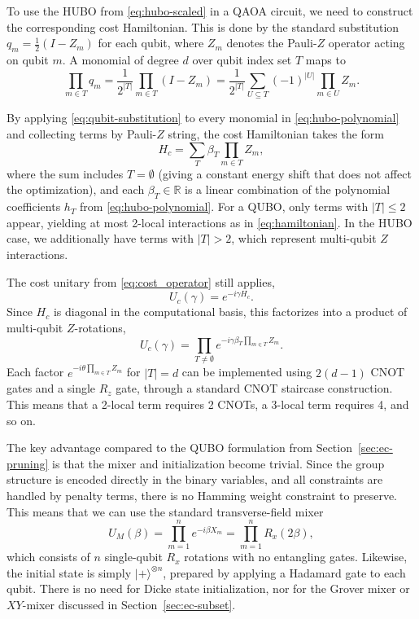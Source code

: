 \documentclass{article}
\begin{document}
To use the HUBO from \eqref{eq:hubo-scaled} in a QAOA circuit, we need to construct the corresponding cost Hamiltonian. This is done by the standard substitution $q_m = \frac{1}{2}(I - Z_m)$ for each qubit, where $Z_m$ denotes the Pauli-$Z$ operator acting on qubit $m$. A monomial of degree $d$ over qubit index set $T$ maps to
\begin{equation}
    \prod_{m \in T} q_m = \frac{1}{2^{|T|}} \prod_{m \in T} (I - Z_m) = \frac{1}{2^{|T|}} \sum_{U \subseteq T} (-1)^{|U|} \prod_{m \in U} Z_m.
    \label{eq:qubit-substitution}
\end{equation}

By applying \eqref{eq:qubit-substitution} to every monomial in \eqref{eq:hubo-polynomial} and collecting terms by Pauli-$Z$ string, the cost Hamiltonian takes the form
\begin{equation}
    H_c = \sum_{T} \beta_T \prod_{m \in T} Z_m,
    \label{eq:hubo-hamiltonian}
\end{equation}
where the sum includes $T = \emptyset$ (giving a constant energy shift that does not affect the optimization), and each $\beta_T \in \mathbb{R}$ is a linear combination of the polynomial coefficients $h_T$ from \eqref{eq:hubo-polynomial}.
For a QUBO, only terms with $|T| \leq 2$ appear, yielding at most 2-local interactions as in \eqref{eq:hamiltonian}. In the HUBO case, we additionally have terms with $|T| > 2$, which represent multi-qubit $Z$ interactions.

The cost unitary from \eqref{eq:cost_operator} still applies,
\begin{equation}
    U_c(\gamma) = e^{-i \gamma H_c}.
\end{equation}
Since $H_c$ is diagonal in the computational basis, this factorizes into a product of multi-qubit $Z$-rotations,
\begin{equation}
    U_c(\gamma) = \prod_{T \neq \emptyset} e^{-i \gamma \beta_T \prod_{m \in T} Z_m}.
    \label{eq:hubo-cost-unitary}
\end{equation}
Each factor $e^{-i \theta \prod_{m \in T} Z_m}$ for $|T| = d$ can be implemented using $2(d-1)$ CNOT gates and a single $R_z$ gate, through a standard CNOT staircase construction. This means that a 2-local term requires 2 CNOTs, a 3-local term requires 4, and so on.

The key advantage compared to the QUBO formulation from Section~\ref{sec:ec-pruning} is that the mixer and initialization become trivial. Since the group structure is encoded directly in the binary variables, and all constraints are handled by penalty terms, there is no Hamming weight constraint to preserve. This means that we can use the standard transverse-field mixer
\begin{equation}
    U_M(\beta) = \prod_{m=1}^{n} e^{-i \beta X_m} = \prod_{m=1}^{n} R_x(2\beta),
    \label{eq:hubo-mixer}
\end{equation}
which consists of $n$ single-qubit $R_x$ rotations with no entangling gates.
Likewise, the initial state is simply $|+\rangle^{\otimes n}$, prepared by applying a Hadamard gate to each qubit.
There is no need for Dicke state initialization, nor for the Grover mixer or $XY$-mixer discussed in Section~\ref{sec:ec-subset}.
\end{document}
